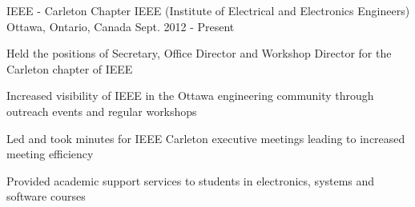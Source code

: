 

\begin{cventries}

  \cventry
    {IEEE - Carleton Chapter} %
    {IEEE (Institute of Electrical and Electronics Engineers)} %
    {Ottawa, Ontario, Canada} %
    {Sept. 2012 - Present} %
    {
      \begin{cvitems} %
        \item {Held the positions of Secretary, Office Director and Workshop Director for the Carleton chapter of IEEE}
        \item {Increased visibility of IEEE in the Ottawa engineering community through outreach events and regular workshops}
        \item {Led and took minutes for IEEE Carleton executive meetings leading to increased meeting efficiency}
        \item {Provided academic support services to students in electronics, systems and software courses}
      \end{cvitems}
    }

\end{cventries}
